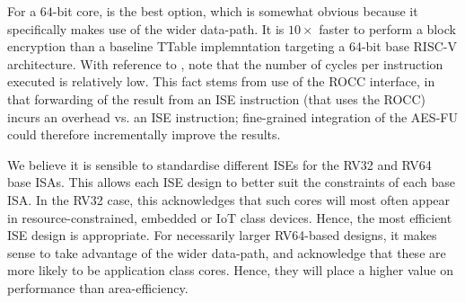 For a $64$-bit core,
is the best option, which is somewhat obvious because it specifically makes
use of the wider data-path.
It is $10\times$ faster to perform a block encryption than a baseline TTable
implemntation targeting a 64-bit base RISC-V architecture.
With reference to
, 
note that the number of cycles per instruction executed is relatively low.
This fact stems from use of the ROCC interface, in that forwarding of the 
result from an ISE instruction (that uses the ROCC) incurs an overhead vs. 
an ISE instruction; fine-grained integration of the AES-FU could therefore
incrementally improve the results.

We believe it is sensible to standardise different ISEs for the
RV32 and RV64 base ISAs.
This allows each ISE design to better suit the constraints of each
base ISA.
In the RV32 case, this acknowledges that such cores will most often
appear in resource-constrained, embedded or IoT class devices.
Hence, the most efficient ISE design is appropriate.
For necessarily larger RV64-based designs, it makes sense to take advantage
of the wider data-path, and acknowledge that these are more likely to
be application class cores. Hence, they will place a higher value
on performance than area-efficiency.


